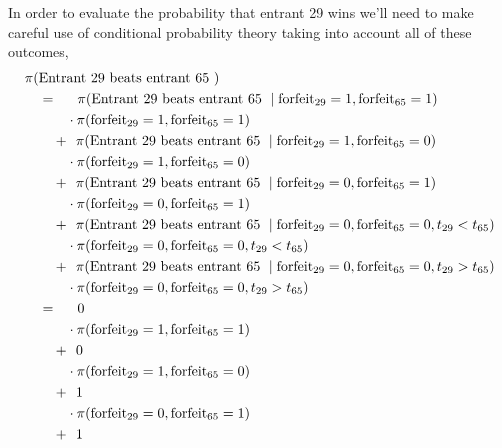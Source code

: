 \documentclass[
  letterpaper,
  DIV=11,
  numbers=noendperiod]{scrartcl}
\begin{document}
In order to evaluate the probability that entrant 29 wins we'll need to
make careful use of conditional probability theory taking into account
all of these outcomes, \begin{align*}
\pi( &\text{Entrant 29 beats entrant 65 } )
\\
&=\quad\;\,
\pi( \text{Entrant 29 beats entrant 65 } \mid
     \mathrm{forfeit}_{29} = 1, \mathrm{forfeit}_{65} = 1)
\\
&\quad\quad \cdot \pi( \mathrm{forfeit}_{29} = 1, \mathrm{forfeit}_{65} = 1 )
\\
&\quad+ \;\,
\pi( \text{Entrant 29 beats entrant 65 } \mid
     \mathrm{forfeit}_{29} = 1, \mathrm{forfeit}_{65} = 0)
\\
&\quad\quad \cdot \pi( \mathrm{forfeit}_{29} = 1, \mathrm{forfeit}_{65} = 0 )
\\
&\quad+ \;\,
\pi( \text{Entrant 29 beats entrant 65 } \mid
     \mathrm{forfeit}_{29} = 0, \mathrm{forfeit}_{65} = 1)
\\
&\quad\quad \cdot \pi( \mathrm{forfeit}_{29} = 0, \mathrm{forfeit}_{65} = 1 )
\\
&\quad+ \;\,
\pi( \text{Entrant 29 beats entrant 65 } \mid
     \mathrm{forfeit}_{29} = 0, \mathrm{forfeit}_{65} = 0, t_{29} < t_{65})
\\
&\quad\quad \cdot \pi( \mathrm{forfeit}_{29} = 0, \mathrm{forfeit}_{65} = 0,
                      t_{29} < t_{65})
\\
&\quad+ \;\,
\pi( \text{Entrant 29 beats entrant 65 } \mid
     \mathrm{forfeit}_{29} = 0, \mathrm{forfeit}_{65} = 0, t_{29} > t_{65})
\\
&\quad\quad \cdot \pi( \mathrm{forfeit}_{29} = 0, \mathrm{forfeit}_{65} = 0,
                       t_{29} > t_{65})
\\
&=\quad\;\,
\vphantom{\pi( \text{Entrant 29 beats entrant 65 } \mid} 0
\\
&\quad\quad \cdot \pi( \mathrm{forfeit}_{29} = 1, \mathrm{forfeit}_{65} = 1 )
\\
&\quad+ \;\,
\vphantom{\pi( \text{Entrant 29 beats entrant 65 } \mid} 0
\\
&\quad\quad \cdot \pi( \mathrm{forfeit}_{29} = 1, \mathrm{forfeit}_{65} = 0 )
\\
&\quad+ \;\,
\vphantom{\pi( \text{Entrant 29 beats entrant 65 } \mid} 1
\\
&\quad\quad \cdot \pi( \mathrm{forfeit}_{29} = 0, \mathrm{forfeit}_{65} = 1 )
\\
&\quad+ \;\,
\vphantom{\pi( \text{Entrant 29 beats entrant 65 } \mid} 1

\end{align*}
\end{document}
